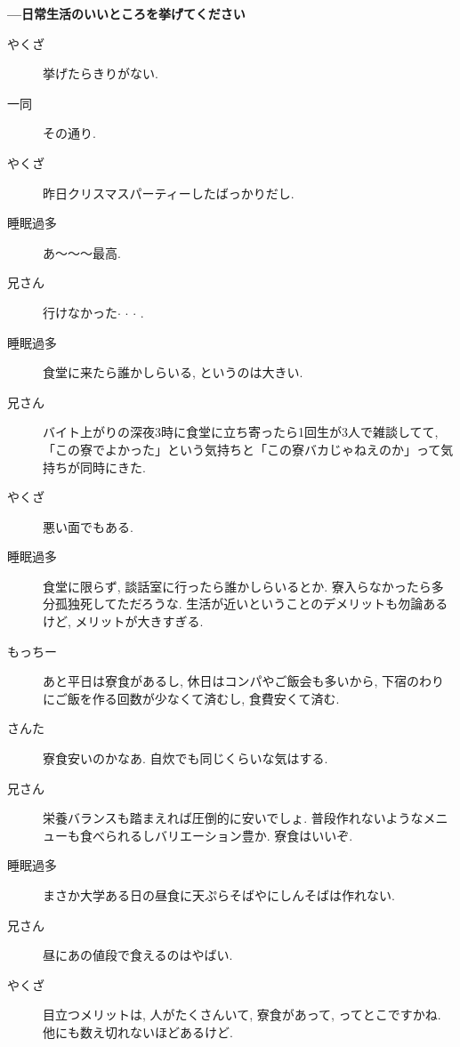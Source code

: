 \documentclass[10pt,b5jsbook,dvips,dvipdfmx,openany]{jsbook}
\theoremstyle{definition}
\begin{document}
\begin{multicols}{2}
		\textbf{---日常生活のいいところを挙げてください}
		\begin{description}
		\item[やくざ]挙げたらきりがない.
		\item[ 一同 ]その通り.
		\item[やくざ]昨日クリスマスパーティーしたばっかりだし.
		\item[睡眠過多]あ〜〜〜最高.
		\item[兄さん]行けなかった$ \cdot $ $ \cdot $ $ \cdot $ .
		\item[睡眠過多]食堂に来たら誰かしらいる, というのは大きい.
		\item[兄さん]バイト上がりの深夜3時に食堂に立ち寄ったら1回生が3人で雑談してて, 「この寮でよかった」という気持ちと「この寮バカじゃねえのか」って気持ちが同時にきた.
		\item[やくざ]悪い面でもある.
		\item[睡眠過多]食堂に限らず, 談話室に行ったら誰かしらいるとか. 寮入らなかったら多分孤独死してただろうな. 生活が近いということのデメリットも勿論あるけど, メリットが大きすぎる.
		\item[もっちー]あと平日は寮食があるし, 休日はコンパやご飯会も多いから, 下宿のわりにご飯を作る回数が少なくて済むし, 食費安くて済む.
		\item[さんた]寮食安いのかなあ. 自炊でも同じくらいな気はする.
		\item[兄さん]栄養バランスも踏まえれば圧倒的に安いでしょ. 普段作れないようなメニューも食べられるしバリエーション豊か. 寮食はいいぞ.
		\item[睡眠過多]まさか大学ある日の昼食に天ぷらそばやにしんそばは作れない.
		\item[兄さん]昼にあの値段で食えるのはやばい.
		\item[やくざ]目立つメリットは, 人がたくさんいて, 寮食があって, ってとこですかね. 他にも数え切れないほどあるけど.
		\end{description}


\end{multicols}
\end{document}
